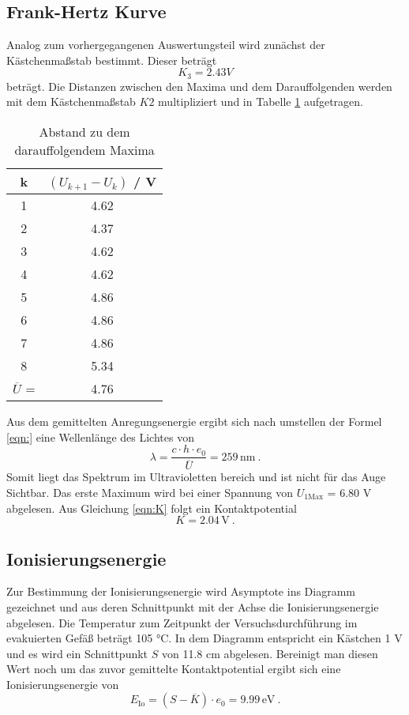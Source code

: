 \subsection{Frank-Hertz Kurve}
Analog zum vorhergegangenen Auswertungsteil wird zunächst der Kästchenmaßstab bestimmt. Dieser beträgt
\begin{equation}
  K_3 = 2.43 V
  \label{eqn:K3}
\end{equation}
beträgt. Die Distanzen zwischen den Maxima und dem Darauffolgenden werden mit dem Kästchenmaßstab $K2$ multipliziert und in Tabelle \ref{tab:Max} aufgetragen.
\begin{table}
  \centering
  \begin{tabular}{c c}
    \toprule
    	k & $(U_{k+1} - U_k)$ / V \\
    \midrule
    	1 & 4.62	\\
    	2 & 4.37	\\
    	3 & 4.62	\\
    	4 & 4.62	\\
    	5 & 4.86	\\
    	6 & 4.86	\\
    	7 & 4.86	\\
    	8 & 5.34	\\
    \midrule
    	$\overline{U}$  = & 4.76 \\
    \bottomrule
  \end{tabular}
  \caption{Abstand zu dem darauffolgendem Maxima}
  \label{tab:Max}
\end{table}
Aus dem gemittelten Anregungsenergie ergibt sich nach umstellen der Formel \ref{eqn:} eine Wellenlänge des Lichtes von
\begin{equation}
  \lambda = \frac{c \cdot h \cdot e_0}{\overline{U}} = 259 \, \text{nm} \ .
  \label{eqn:spek}
\end{equation}
Somit liegt das Spektrum im Ultravioletten bereich und ist nicht für das Auge Sichtbar. Das erste Maximum wird bei einer Spannung von $U_{1 \text{Max}}$ = 6.80 V abgelesen. Aus Gleichung \ref{eqn:K} folgt ein Kontaktpotential
\begin{equation}
  K = 2.04 \, \text{V} \ .
  \label{eqn:KonFr}
\end{equation}
\subsection{Ionisierungsenergie}
Zur Bestimmung der Ionisierungsenergie wird Asymptote ins Diagramm gezeichnet und aus deren Schnittpunkt mit der Achse die Ionisierungsenergie abgelesen. Die Temperatur zum Zeitpunkt der Versuchsdurchführung im evakuierten Gefäß beträgt 105 °C. In dem Diagramm entspricht ein Kästchen 1 V und es wird ein Schnittpunkt $S$ von 11.8 cm abgelesen. Bereinigt man diesen Wert noch um das zuvor gemittelte Kontaktpotential ergibt sich eine Ionisierungsenergie von
\begin{equation}
  E_\text{Io} = (S - \overline{K}) \cdot e_0 = 9.99 \, \text{eV} \ .
  \label{eqn:EIo}
\end{equation}
